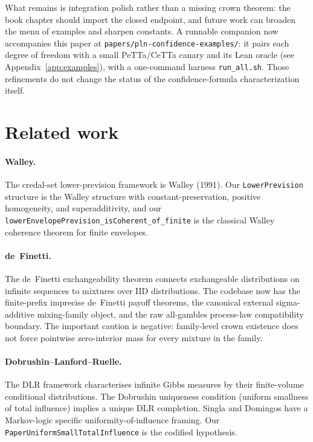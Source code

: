\documentclass[]{article}
\newcommand{\lid}[1]{{\ttfamily\nolinkurl{#1}}}
\newcommand{\lpath}[1]{\texttt{\nolinkurl{#1}}}
\begin{document}
What remains is integration polish rather than a missing crown theorem: the
book chapter should import the closed endpoint, and future work can broaden the
menu of examples and sharpen constants. A runnable companion now accompanies
this paper at \lpath{papers/pln-confidence-examples/}: it pairs each degree of
freedom with a small PeTTa/CeTTa canary and its Lean oracle (see
Appendix~\ref{app:examples}), with a one-command harness \lpath{run_all.sh}.
Those refinements do not change the status of the confidence-formula
characterization itself.

\section{Related work}\label{sec:related}

\paragraph{Walley.}
The credal-set lower-prevision framework is Walley (1991). Our
\lid{LowerPrevision} structure is the Walley structure with
constant-preservation, positive homogeneity, and superadditivity, and
our \lid{lowerEnvelopePrevision\_isCoherent\_of\_finite} is the
classical Walley coherence theorem for finite envelopes.

\paragraph{de~Finetti.}
The de~Finetti exchangeability theorem connects exchangeable distributions
on infinite sequences to mixtures over IID distributions. The codebase now
has the finite-prefix imprecise de~Finetti payoff theorems, the canonical
external sigma-additive mixing-family object, and the raw all-gambles
process-law compatibility boundary. The important caution is negative:
family-level crown existence does not force pointwise zero-interior mass for
every mixture in the family.

\paragraph{Dobrushin--Lanford--Ruelle.}
The DLR framework characterises infinite Gibbs measures by their
finite-volume conditional distributions. The Dobrushin uniqueness
condition (uniform smallness of total influence) implies a unique DLR
completion. Singla and Domingos have a Markov-logic specific
uniformity-of-influence framing. Our \lid{PaperUniformSmallTotalInfluence}
is the codified hypothesis.
\end{document}
